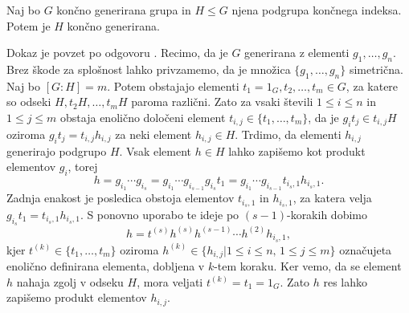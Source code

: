 \begin{lema}\label{lem_podgrupa_koncno_generirane_koncnega_indeksa}
    Naj bo $G$ končno generirana grupa in $H \le G$ njena podgrupa končnega indeksa. Potem je $H$ končno generirana. 
\end{lema}
\begin{dokaz}
    Dokaz je povzet po odgovoru \cite{stackoverflow_13066}. Recimo, da je $G$ generirana z elementi $g_1, \ldots , g_n$. Brez škode za splošnost lahko privzamemo, da je množica $\{ g_1 , \ldots, g_n \}$ simetrična. Naj bo $[G : H] = m$. Potem obstajajo elementi $t_1 = 1_G, t_2, \ldots, t_m \in G$, za katere so odseki $H, t_2 H, \ldots, t_m H$ paroma različni. Zato za vsaki števili $1 \le i \le n$ in $1 \le j \le m$ obstaja enolično določeni element $t_{i,j} \in \{t_1, \ldots, t_m \}$, da je $g_i  t_j \in t_{i, j} H$ oziroma $g_i t_j = t_{i, j} h_{i, j}$ za neki element $h_{i, j} \in H$. Trdimo, da elementi $h_{i, j}$ generirajo podgrupo $H$. Vsak element $h \in H$ lahko zapišemo kot produkt elementov $g_i$, torej \begin{equation*}
        h = g_{i_1} \cdots  g_{i_s} = g_{i_1} \cdots g_{i_{s - 1}} g_{i_s} t_1 = g_{i_1} \cdots g_{i_{s - 1}} t_{i_s, 1} h_{i_s, 1}.
    \end{equation*}
    Zadnja enakost je posledica obstoja elementov $t_{i_s, 1}$ in $h_{i_s, 1}$, za katera velja $g_{i_s} t_1 = t_{i_s, 1} h_{i_s, 1}$.
    S ponovno uporabo te ideje po $(s -1)$-korakih dobimo \begin{equation*}
        h = t^{(s)} h^{(s)} h^{(s -1)} \cdots h^{(2)} h_{i_s, 1},
    \end{equation*} 
    kjer $t^{(k)} \in \{t_1, \ldots, t_m \}$ oziroma $h^{(k)} \in \{ h_{i, j} \vert 1 \le i \le n,\, 1 \le j \le m \}$ označujeta enolično definirana elementa, dobljena v $k$-tem koraku. Ker vemo, da se element $h$ nahaja zgolj v odseku $H$, mora veljati $t^{(k)} = t_1 =  1_G$. Zato $h$ res lahko zapišemo produkt elementov $h_{i , j}$.  
\end{dokaz}

